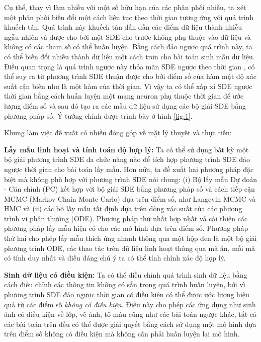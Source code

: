 \documentclass{article} %
\begin{document}
Cụ thể, thay vì làm nhiễu với một số hữu hạn của các phân phối nhiễu, ta xét một phân phối biến đổi một cách liên tục theo thời gian tương ứng với quá trình khuếch tán.
Quá trình này khuếch tán dần dần các điểm dữ liệu thành nhiễu ngẫu nhiên và được cho bởi một SDE cho trước không phụ thuộc vào dữ liệu và không có các tham số có thể huấn luyện.
Bằng cách đảo ngược quá trình này, ta có thể biến đổi nhiễu thành dữ liệu một cách trơn cho bài toán sinh mẫu dữ liệu.
Điều quan trọng là quá trình ngược này thỏa mãn SDE ngược theo thời gian \citep{anderson1982reverse}, có thể suy ra từ phương trình SDE thuận được cho bởi điểm số của hàm mật độ xác suất cận biên như là một hàm của thời gian.
Vì vậy ta có thể xấp xỉ SDE ngược thời gian bằng cách huấn luyện một mạng neuron phụ thuộc thời gian để ước lượng điểm số và sau đó tạo ra các mẫu dữ liệu sử dụng các bộ giải SDE bằng phương pháp số.
Ý tưởng chính được trình bày ở hình \ref{fig:1}.

Khung làm việc đề xuất có nhiều đóng góp về mặt lý thuyết và thực tiễn:

\textbf{Lấy mẫu linh hoạt và tính toán độ hợp lý:} Ta có thể sử dụng bất kỳ một bộ giải phương trình SDE đa chức năng nào để tích hợp phương trình SDE đảo ngược thời gian cho bài toán lấy mẫu.
Hơn nữa, ta đề xuất hai phương pháp đặc biệt mà không phù hợp với phương trình SDE nói chung: (i) Bộ lấy mẫu Dự đoán - Căn chỉnh (PC) kết hợp với bộ giải SDE bằng phương pháp số và cách tiếp cận MCMC (Markov Chain Monte Carlo) dựa trên điểm số, như Langevin MCMC \citep{parisi1981correlation} và HMC \citep{neal2011mcmc} và (ii) các bộ lấy mẫu tất định dựa trên dòng xác suất của các phương trình vi phân thường (ODE).
Phương pháp thứ nhất hợp nhất vả cải thiện các phương pháp lấy mẫu hiện có cho các mô hình dựa trên điểm số.
Phương pháp thứ hai cho phép lấy mẫu thích ứng nhanh thông qua một hộp đen là một bộ giải phương trình ODE, các thao tác trên dữ liệu linh hoạt thông qua mã ẩn, mỗi mã có tính duy nhất và điều đáng chú ý ta có thể tính chính xác độ hợp lý.

\textbf{Sinh dữ liệu có điều kiện:} Ta có thể điều chỉnh quá trình sinh dữ liệu bằng cách điều chỉnh các thông tin không có sẵn trong quá trình huấn luyện, bởi vì phương trình SDE đảo ngược thời gian có điều kiện có thể được ước lượng hiệu quả từ các điểm số \textit{không có điều kiện}.
Điều này cho phép các ứng dụng như sinh ảnh có điều kiện về lớp, vẽ ảnh, tô màu cũng như các bài toán ngược khác, tất cả các bài toán trên đều có thể được giải quyết bằng cách sử dụng một mô hình dựa trên điểm số không có điều kiện mà không cần phải huấn luyện lại mô hình.
\end{document}
